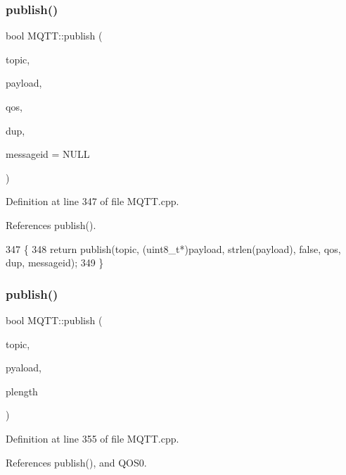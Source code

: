 \subsubsection{publish()\hspace{0.1cm}{\footnotesize\ttfamily [4/10]}}
{\footnotesize\ttfamily bool M\+Q\+T\+T\+::publish (\begin{DoxyParamCaption}\item[{const char $\ast$}]{topic,  }\item[{const char $\ast$}]{payload,  }\item[{\textbf{ E\+M\+Q\+T\+T\+\_\+\+Q\+OS}}]{qos,  }\item[{bool}]{dup,  }\item[{uint16\+\_\+t $\ast$}]{messageid = {\ttfamily NULL} }\end{DoxyParamCaption})}



Definition at line 347 of file M\+Q\+T\+T.\+cpp.



References publish().


\begin{DoxyCode}
347                                                                                                         \{
348     \textcolor{keywordflow}{return} publish(topic, (uint8\_t*)payload, strlen(payload), \textcolor{keyword}{false}, qos, dup, messageid);
349 \}
\end{DoxyCode}
\mbox{\label{class_m_q_t_t_a6a5dd9b7c19f2892802a222ec5d610b5}} 
\subsubsection{publish()\hspace{0.1cm}{\footnotesize\ttfamily [5/10]}}
{\footnotesize\ttfamily bool M\+Q\+T\+T\+::publish (\begin{DoxyParamCaption}\item[{const char $\ast$}]{topic,  }\item[{const uint8\+\_\+t $\ast$}]{pyaload,  }\item[{unsigned int}]{plength }\end{DoxyParamCaption})}



Definition at line 355 of file M\+Q\+T\+T.\+cpp.



References publish(), and Q\+O\+S0.


